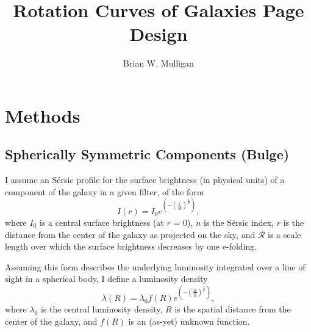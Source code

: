 \documentclass{article}
\title{Rotation Curves of Galaxies Page Design}
\author{Brian W. Mulligan}
\date{}
\begin{document}
\maketitle
\thispagestyle{fancy}
\section{Methods}
\subsection{Spherically Symmetric Components (Bulge)}
I assume an S\'ersic profile for the surface brightness (in physical units) of a component of the galaxy in a given filter, of the form
\begin{equation} I(r) = \label{eq:SersicSFB} I_0 e^{\left(-\left(\frac{r}{\mathcal{R}}\right)^{\frac{1}{n}}\right)} , \end{equation}
where $I_0$ is a central surface brightness (at $r$ = 0), $n$ is the S\'ersic index, $r$ is the distance from the center of the galaxy as projected on the sky, and $\mathcal{R}$ is a scale length over which the surface brightness decreases by one e-folding.


Assuming this form describes the underlying luminosity integrated over a line of sight in a spherical body, I define a luminosity density 
\begin{equation} \label{eq:lumDensityUnk} \lambda(R) = \lambda_0 f(R) e^{\left(-\left(\frac{R}{\mathcal{R}}\right)^{\frac{1}{n}}\right)}, \end{equation}
where $\lambda_0$ is the central luminosity density, $R$ is the spatial distance from the center of the galaxy, and  $f(R)$ is an (as-yet) unknown function.
\end{document}
